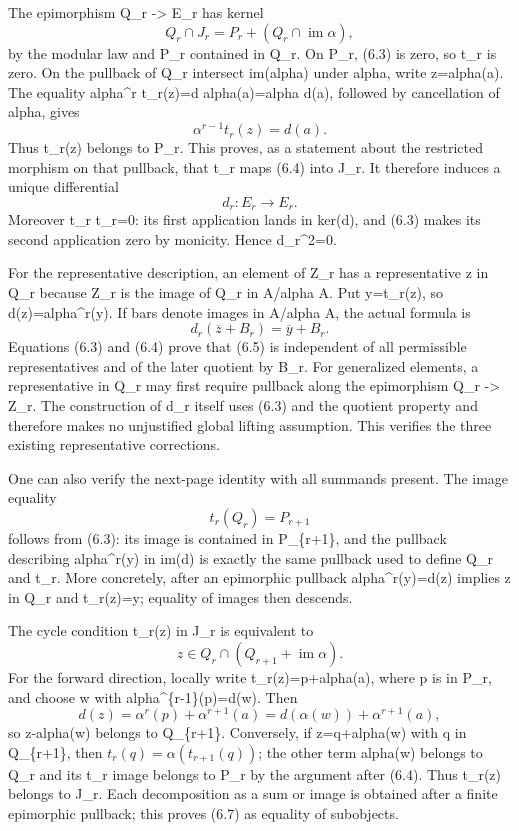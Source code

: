\documentclass[11pt]{article}
\begin{document}
The epimorphism Q\_r -\textgreater{} E\_r has kernel \[
Q_r\cap J_r=P_r+(Q_r\cap\operatorname{im}\alpha),           \tag{6.4}
\] by the modular law and P\_r contained in Q\_r. On P\_r, (6.3) is zero, so t\_r is zero. On the pullback of Q\_r intersect im(alpha) under alpha, write z=alpha(a). The equality alpha\^{}r t\_r(z)=d alpha(a)=alpha d(a), followed by cancellation of alpha, gives \[
\alpha^{r-1}t_r(z)=d(a).
\] Thus t\_r(z) belongs to P\_r. This proves, as a statement about the restricted morphism on that pullback, that t\_r maps (6.4) into J\_r. It therefore induces a unique differential \[
d_r:E_r\longrightarrow E_r.
\] Moreover t\_r t\_r=0: its first application lands in ker(d), and (6.3) makes its second application zero by monicity. Hence d\_r\^{}2=0.

For the representative description, an element of Z\_r has a representative z in Q\_r because Z\_r is the image of Q\_r in A/alpha A. Put y=t\_r(z), so d(z)=alpha\^{}r(y). If bars denote images in A/alpha A, the actual formula is \[
d_r(\overline z+B_r)=\overline y+B_r.                     \tag{6.5}
\] Equations (6.3) and (6.4) prove that (6.5) is independent of all permissible representatives and of the later quotient by B\_r. For generalized elements, a representative in Q\_r may first require pullback along the epimorphism Q\_r -\textgreater{} Z\_r. The construction of d\_r itself uses (6.3) and the quotient property and therefore makes no unjustified global lifting assumption. This verifies the three existing representative corrections.

One can also verify the next-page identity with all summands present. The image equality \[
t_r(Q_r)=P_{r+1}                                         \tag{6.6}
\] follows from (6.3): its image is contained in P\_\{r+1\}, and the pullback describing alpha\^{}r(y) in im(d) is exactly the same pullback used to define Q\_r and t\_r. More concretely, after an epimorphic pullback alpha\^{}r(y)=d(z) implies z in Q\_r and t\_r(z)=y; equality of images then descends.

The cycle condition t\_r(z) in J\_r is equivalent to \[
z\in Q_r\cap(Q_{r+1}+\operatorname{im}\alpha).             \tag{6.7}
\] For the forward direction, locally write t\_r(z)=p+alpha(a), where p is in P\_r, and choose w with alpha\^{}\{r-1\}(p)=d(w). Then \[
d(z)=\alpha^r(p)+\alpha^{r+1}(a)
     =d(\alpha(w))+\alpha^{r+1}(a),
\] so z-alpha(w) belongs to Q\_\{r+1\}. Conversely, if z=q+alpha(w) with q in Q\_\{r+1\}, then \(t_r(q)=\alpha(t_{r+1}(q))\); the other term alpha(w) belongs to Q\_r and its t\_r image belongs to P\_r by the argument after (6.4). Thus t\_r(z) belongs to J\_r. Each decomposition as a sum or image is obtained after a finite epimorphic pullback; this proves (6.7) as equality of subobjects.
\end{document}
